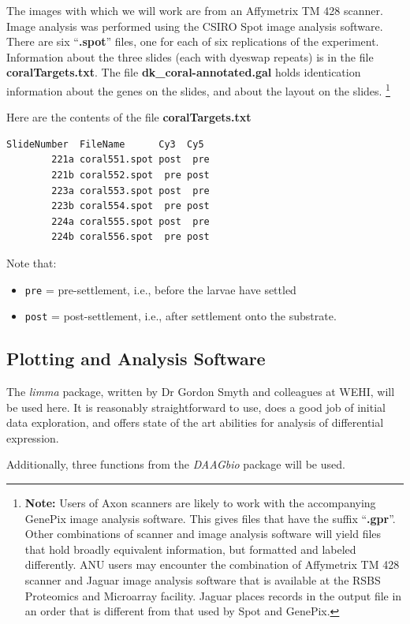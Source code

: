 \documentclass[a4paper,9pt]{article}\usepackage[]{graphicx}\usepackage[]{xcolor}
\begin{document}
The images with which we will work are from an Affymetrix TM 428
scanner.  Image analysis was performed using the CSIRO Spot image
analysis software.  There are six ``\textbf{.spot}'' files, one for
each of six replications of the experiment.  Information about the
three slides (each with dyeswap repeats) is in the file
\textbf{coralTargets.txt}.  The file \textbf{dk\_coral-annotated.gal}
holds identication information about the genes on the slides, and
about the layout on the slides.  \footnote{\textbf{Note:} Users of
Axon scanners are likely to work with the accompanying GenePix image
analysis software. This gives files that have the suffix
``\textbf{.gpr}''.  Other combinations of scanner and image analysis
software will yield files that hold broadly equivalent information,
but formatted and labeled differently. ANU users may encounter the
combination of Affymetrix TM 428 scanner and Jaguar image analysis
software that is available at the RSBS Proteomics and Microarray
facility.  Jaguar places records in the output file in an order that
is different from that used by Spot and GenePix.}

Here are the contents of the file \textbf{coralTargets.txt}
\begin{verbatim}
SlideNumber  FileName      Cy3  Cy5
        221a coral551.spot post  pre
        221b coral552.spot  pre post
        223a coral553.spot post  pre
        223b coral554.spot  pre post
        224a coral555.spot post  pre
        224b coral556.spot  pre post
\end{verbatim}
Note that:
\begin{itemize}
\item [] \texttt{pre} = pre-settlement, i.e., before the larvae have settled
\item [] \texttt{post} = post-settlement, i.e., after settlement onto the
substrate.
\end{itemize}

\subsection{Plotting and Analysis Software}

The \textit{limma} package, written by Dr Gordon Smyth and colleagues
at WEHI, will be used here. It is reasonably straightforward to use,
does a good job of initial data exploration, and offers state of the
art abilities for analysis of differential expression.

Additionally, three functions from the \textit{DAAGbio} package will
be used.
\end{document}
